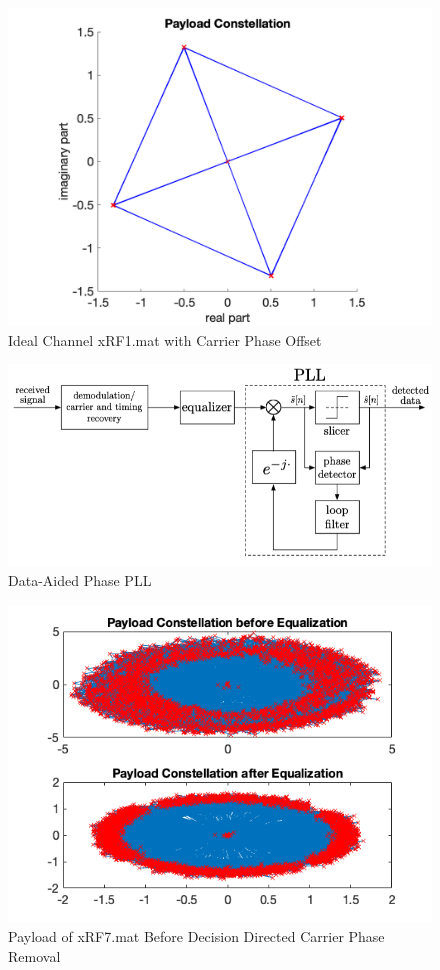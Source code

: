 \begin{figure}[h!]
    \centering
    \includegraphics[scale=0.4]{figures/ideal-channel-carrier-phase.png}
    \caption{Ideal Channel xRF1.mat with Carrier Phase Offset}
    \label{fig:phase-rotate}
\end{figure}
\begin{figure}[h!]
    \centering
    \includegraphics[scale=0.4]{figures/phase_pll.png}
    \caption{Data-Aided Phase PLL}
    \label{fig:phase-pll}
\end{figure}
\begin{figure}[h!]
    \centering
    \includegraphics[scale=0.4]{figures/payload_xrf7_before_dd.png}
    \caption{Payload of xRF7.mat Before Decision Directed Carrier Phase Removal}
    \label{fig:before-dd}
\end{figure}
